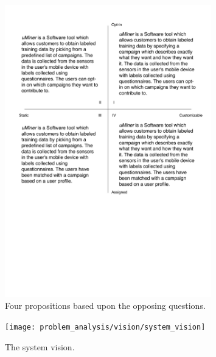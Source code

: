 \begin{figure}[!htbp]
	\centering
	\includegraphics[width=0.8\textwidth]{graphic/problem_analysis/vision/propositions.pdf}
	\caption{Four propositions based upon the opposing questions.}
	\label{fig:proposition}
\end{figure}
\FloatBarrier

\begin{figure}[!htbp]
    \centering
    \texttt{[image: problem\_analysis/vision/system\_vision]}
    \caption{The system vision.}
    \label{fig:system_vision}
\end{figure}
\FloatBarrier